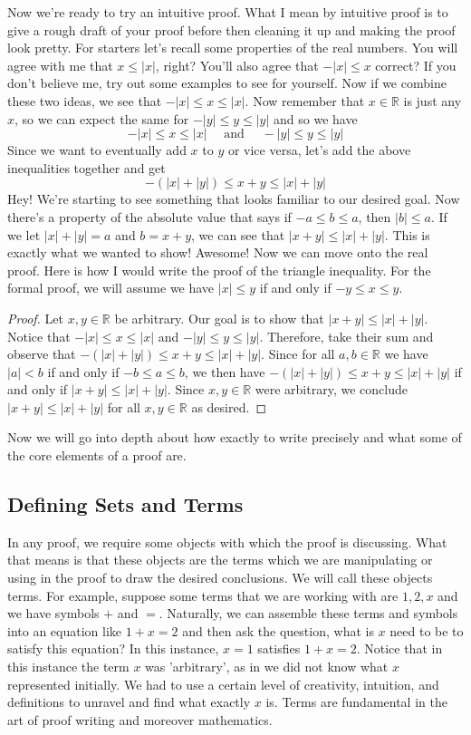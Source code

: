 \documentclass[12pt]{book}
\def\R{{\mathbb{R}}}
\begin{document}
	Now we're ready to try an intuitive proof. What I mean by intuitive proof is to give a rough draft of your proof before then cleaning it up and making the proof look pretty. For starters let's recall some properties of the real numbers. You will agree with me that $x\leq |x|$, right? You'll also agree that $-|x|\leq x$ correct? If you don't believe me, try out some examples to see for yourself. Now if we combine these two ideas, we see that $-|x|\leq x\leq |x|$. Now remember that $x\in\R$ is just any $x$, so we can expect the same for $-|y|\leq y\leq |y|$ and so we have
	\[-|x|\leq x\leq |x|\quad\text{ and }\quad-|y|\leq y\leq |y|\]
Since we want to eventually add $x$ to $y$ or vice versa, let's add the above inequalities together and get
	\[-(|x|+|y|)\leq x+y\leq |x|+|y|\]
Hey! We're starting to see something that looks familiar to our desired goal. Now there's a property of the absolute value that says if $-a\leq b\leq a$, then $|b|\leq a$. If we let $|x|+|y|=a$ and $b=x+y$, we can see that $|x+y|\leq |x|+|y|$. This is exactly what we wanted to show! Awesome! Now we can move onto the real proof. Here is how I would write the proof of the triangle inequality. For the formal proof, we will assume we have $|x|\leq y$ if and only if $-y\leq x\leq y$.

\begin{proof} 
Let $x,y\in\R$ be arbitrary. Our goal is to show that $|x+y|\leq |x|+|y|$. Notice that $-|x|\leq x\leq |x|$ and $-|y|\leq y\leq |y|$. Therefore, take their sum and observe that $-(|x|+|y|)\leq x+y\leq |x|+|y|$. Since for all $a,b\in\R$ we have $|a|<b$ if and only if $-b\leq a\leq b$, we then have $-(|x|+|y|)\leq x+y\leq |x|+|y|$ if and only if $|x+y|\leq |x|+|y|$. Since $x,y\in\R$ were arbitrary, we conclude $|x+y|\leq |x|+|y|$ for all $x,y\in\R$ as desired. \end{proof}

Now we will go into depth about how exactly to write precisely and what some of the core elements of a proof are.

\subsection*{Defining Sets and Terms}
	In any proof, we require some objects with which the proof is discussing. What that means is that these objects are the terms which we are manipulating or using in the proof to draw the desired conclusions. We will call these objects terms. For example, suppose some terms that we are working with are $1,2,x$ and we have symbols $+$ and $=$. Naturally, we can assemble these terms and symbols into an equation like $1+x=2$ and then ask the question, what is $x$ need to be to satisfy this equation? In this instance, $x=1$ satisfies $1+x=2$. Notice that in this instance the term $x$ was 'arbitrary', as in we did not know what $x$ represented initially. We had to use a certain level of creativity, intuition, and definitions to unravel and find what exactly $x$ is. Terms are fundamental in the art of proof writing and moreover mathematics.
\end{document}
